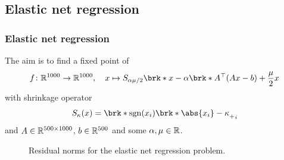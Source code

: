 %
%
%		
%
%
%		

\subsection{Elastic net regression}

\begin{frame}
	\frametitle{Elastic net regression}
	The aim is to find a fixed point of
	\begin{align*}
		f\colon\R^{1000}\to\R^{1000}, \quad x\mapsto S_{\alpha\mu/2}\brk*{x-\alpha\brk*{A^\top(Ax-b)+\frac{\mu}{2}x}}
	\end{align*}
	with shrinkage operator
	\begin{align*}
		S_\kappa(x) = \brk*{\sgn(x_i)\brk*{\abs{x_i}-\kappa}_+}_i
	\end{align*}
	and $A\in\mathbb{R}^{500\times 1000}$, $b\in\mathbb{R}^{500}$ and some $\alpha, \mu\in\mathbb{R}$.
\end{frame}


\begin{frame}
	\begin{figure}
		\centering
		{\scriptsize
		
		}
		\caption{Residual norms for the elastic net regression problem.}
	\end{figure}
\end{frame}

